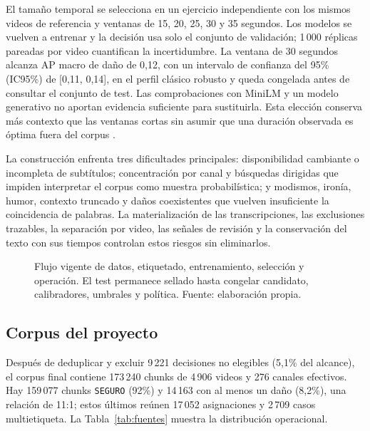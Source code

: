El tamaño temporal se selecciona en un ejercicio independiente con los mismos videos de referencia y ventanas de 15, 20, 25, 30 y 35 segundos. Los modelos se vuelven a entrenar y la decisión usa solo el conjunto de validación; 1\,000 réplicas pareadas por video cuantifican la incertidumbre. La ventana de 30 segundos alcanza AP macro de daño de 0,12, con un intervalo de confianza del 95\% (IC95\%) de [0,11, 0,14], en el perfil clásico robusto y queda congelada antes de consultar el conjunto de test. Las comprobaciones con MiniLM y un modelo generativo no aportan evidencia suficiente para sustituirla. Esta elección conserva más contexto que las ventanas cortas sin asumir que una duración observada es óptima fuera del corpus \cite{cawley2010selection,saito2015pr}.

La construcción enfrenta tres dificultades principales: disponibilidad cambiante o incompleta de subtítulos; concentración por canal y búsquedas dirigidas que impiden interpretar el corpus como muestra probabilística; y modismos, ironía, humor, contexto truncado y daños coexistentes que vuelven insuficiente la coincidencia de palabras. La materialización de las transcripciones, las exclusiones trazables, la separación por video, las señales de revisión y la conservación del texto con sus tiempos controlan estos riesgos sin eliminarlos.

\begin{figure}[t]
\centering
\resizebox{\textwidth}{!}{}
\caption{Flujo vigente de datos, etiquetado, entrenamiento, selección y operación. El test permanece sellado hasta congelar candidato, calibradores, umbrales y política. Fuente: elaboración propia.}
\label{fig:pipeline}
\end{figure}

\subsection{Corpus del proyecto}

Después de deduplicar y excluir 9\,221 decisiones no elegibles (5,1\% del alcance), el corpus final contiene 173\,240 chunks de 4\,906 videos y 276 canales efectivos. Hay 159\,077 chunks \texttt{SEGURO} (92\%) y 14\,163 con al menos un daño (8,2\%), una relación de 11:1; estos últimos reúnen 17\,052 asignaciones y 2\,709 casos multietiqueta. La Tabla~\ref{tab:fuentes} muestra la distribución operacional.

